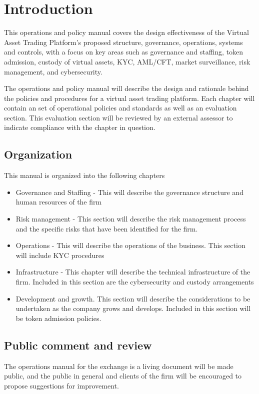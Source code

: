 \chapter{Introduction}

This operations and policy manual covers the design effectiveness of
the Virtual Asset Trading Platform's proposed structure, governance,
operations, systems and controls, with a focus on key areas such as
governance and staffing, token admission, custody of virtual assets,
KYC, AML/CFT, market surveillance, risk management, and cybersecurity.

The operations and policy manual will describe the design and
rationale behind the policies and procedures for a virtual asset
trading platform.  Each chapter will contain an set of operational
policies and standards as well as an evaluation section.  This
evaluation section will be reviewed by an external assessor to
indicate compliance with the chapter in question.

\section{Organization}

This manual is organized into the following chapters

\begin{itemize}
  \item Governance and Staffing - This will describe the governance
    structure and human resources of the firm
  \item Risk management - This section will describe the risk
    management process and the specific risks that have been
    identified for the firm.
  \item Operations - This will describe the operations of the
    business.  This section will include KYC procedures
  \item Infrastructure - This chapter will describe the technical
    infrastructure of the firm.  Included in this section are the
    cybersecurity and custody arrangements
  \item Development and growth.  This section will describe the
    considerations to be undertaken as the company grows and develops.
    Included in this section will be token admission policies.
\end{itemize}

\section{Public comment and review}
The operations manual for the exchange is a living document will be
made public, and the public in general and clients of the firm will be
encouraged to propose suggestions for improvement.

